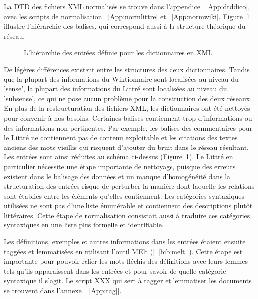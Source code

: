 La DTD des fichiers XML normalisés se trouve dans l'appendice 
\hyperref[App:dtddico]{~\ref*{App:dtddico}}, 
avec les scripts de normalisation 
\hyperref[App:normlittre]{~\ref*{App:normlittre}} et 
\hyperref[App:normwiki]{~\ref*{App:normwiki}}. 
\hyperref[fig:XMLhierarchy]{Figure~\ref*{fig:XMLhierarchy}} illustre 
l'hiérarchie des balises, qui correspond aussi à la structure théorique du 
réseau.

\begin{figure}[!ht]
\centering
\def\svgwidth{\columnwidth}

\caption{L'hiérarchie des entrées définie pour les dictionnaires en XML}
\label{fig:XMLhierarchy}
\end{figure}


De légères différences existent entre les structures des deux dictionnaires. 
Tandis que la plupart des informations du Wiktionnaire sont localisées au niveau 
du 'sense', la plupart des informations du Littré sont localisées au niveau du 
'subsense', ce qui ne pose aucun problème pour la construction des deux réseaux.
\newline
\newline
En plus de la restructuration des fichiers XML, les dictionnaires ont été 
nettoyés pour convenir à nos besoins. Certaines balises contiennent trop 
d'informations ou des informations non-pertinentes. Par exemple, les balises des 
commentaires pour le Littré ne contiennent pas de contenu exploitable et les 
citations des textes anciens des mots vieillis qui risquent d'ajouter du bruit 
dans le réseau résultant. Les entrées sont ainsi réduites au schéma ci-dessus 
(\hyperref[fig:XMLhierarchy]{Figure~\ref*{fig:XMLhierarchy}}). Le Littré en 
particulier nécessite une étape importante de nettoyage, puisque des erreurs 
existent dans le balisage des données et un manque d'homogénéité dans la 
structuration des entrées risque de perturber la manière dont laquelle les 
relations sont établies entre les éléments qu'elles contiennent. Les catégories 
syntaxiques utilisées ne sont pas d'une liste énumérable et contiennent des 
descriptions plutôt littéraires. Cette étape de normalisation consistait aussi à 
traduire ces catégories syntaxiques en une liste plus formelle et identifiable.

Les définitions, exemples et autres informations dans les entrées étaient 
ensuite taggées et lemmatisées en utilisant l'outil MElt 
(\hyperref[bib:melt]{[~\ref*{bib:melt}]}). Cette étape est importante pour 
pouvoir relier les mots fléchis des définitions avec leurs lemmes tels qu'ils 
apparaissent dans les entrées et pour savoir de quelle catégorie syntaxique il 
s'agit. Le script XXX qui sert à tagger et lemmatiser les documents se trouvent 
dans l'annexe \hyperref[App:tag]{[~\ref*{App:tag}]}.

